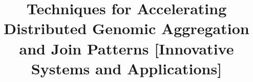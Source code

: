 \documentclass{vldb}
\begin{document}

\title{Techniques for Accelerating Distributed Genomic Aggregation and Join Patterns [Innovative Systems and Applications]}


%
%
%
%

\end{document}
